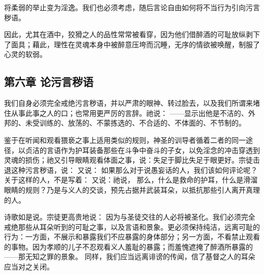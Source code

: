 \par

将柔弱的举止变为淫逸。我们也必须考虑，随后言论自由如何将不当行为引向污言秽语。\par

\par

因此，尤其在酒中，狡猾之人的品性常常被看穿，因为他们借醉酒的可耻放纵剥下了面具；藉此，理性在灵魂本身中被醉意压垮而沉睡，无序的情欲被唤醒，制服了心灵的软弱。\par


\subsection{第六章 论污言秽语}

我们自身必须完全戒绝污言秽语，并以严肃的眼神、转过脸去，以及我们所谓来堵住从事此事之人的口；也常用更严厉的言辞。祂说：  ——显示出他是不洁的、外邦的、未受训练的、放荡的、不蒙拣选的、不合适的、不体面的、不节制的。\par

鉴于在听闻和观看猥亵之事上适用类似的规则，神圣的训导者循着二者的同一途径，以贞洁的言语作为护耳装备那些在斗争中奋斗的子女，以免淫念的冲击穿透到灵魂的损伤；祂又引导眼睛观看体面之事，说：失足于脚比失足于眼更好。宗徒击退这种污言秽语，说：  又说：  如果那么对于说愚妄话的人，我们该如何评论呢？关于这样的人，不是写着： 又说：祂说，  那么，什么是救命的护耳，什么是滑溜眼睛的规则？乃是与义人的交谈，预先占据并武装耳朵，以抵抗那些引人离开真理的人。\par

\par

诗歌如是说。宗徒更高贵地说：  因为与圣徒交往的人必将被圣化。我们必须完全戒绝那些从耳朵听到的可耻之事，以及言语和景象。更必须保持纯洁，远离可耻的行为：一方面，不展示和暴露我们不应暴露的身体部分；另一方面，不看禁止观看的事物。因为孝顺的儿子不忍观看义人羞耻的暴露；而羞愧遮掩了醉酒所暴露的——那无知之罪的景象。 同样，我们应当远离诽谤的传闻，信了基督之人的耳朵应当对之关闭。\par

